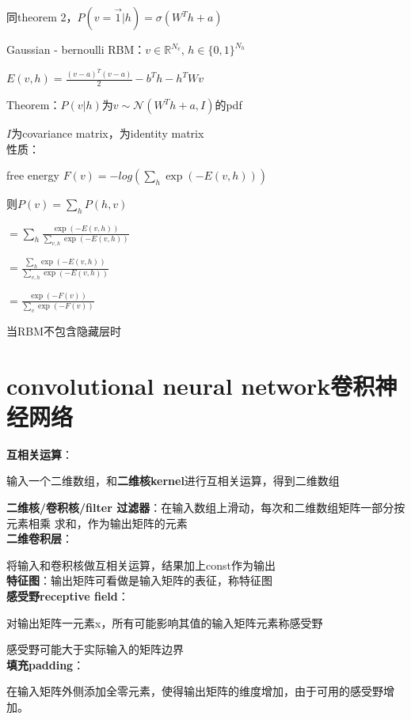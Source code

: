 \documentclass[UTF8]{ctexart}
\begin{document}
  \quad 同theorem 2，$P(v = \vec{1} | h) = \sigma(W^Th + a)$

  Gaussian - bernoulli RBM：$v \in \mathbb{R}^{N_v}$, $h \in \{0, 1\}^{N_h}$

  \quad $E(v, h) = \frac{(v - a)^T(v - a)}{2} - b^Th - h^TWv$

  \quad Theorem：$P(v | h)$为$v \sim \mathcal{N}(W^Th + a, I)$的pdf

  \quad \quad $I$为covariance matrix，为identity matrix\\
性质：

  free energy $F(v) = -log(\sum_h \exp(-E(v, h)))$

  \quad 则$P(v) = \sum_h P(h, v)$

  \quad \quad $ = \sum_h \frac{\exp(-E(v, h))}{\sum_{v, h} \exp(-E(v, h))}$

  \quad \quad $ = \frac{\sum_h\exp(-E(v, h))}{\sum_{v, h} \exp(-E(v, h))}$

  \quad \quad $ = \frac{\exp(-F(v))}{\sum_v \exp(-F(v))}$

  当RBM不包含隐藏层时



\section{convolutional neural network卷积神经网络}
\noindent \textbf{互相关运算}：

  输入一个二维数组，和\textbf{二维核kernel}进行互相关运算，得到二维数组

  \textbf{二维核/卷积核/filter 过滤器}：在输入数组上滑动，每次和二维数组矩阵一部分按元素相乘 求和，作为输出矩阵的元素\\
\textbf{二维卷积层}：

  将输入和卷积核做互相关运算，结果加上const作为输出\\
\textbf{特征图}：输出矩阵可看做是输入矩阵的表征，称特征图\\
\textbf{感受野receptive field}：
  
  对输出矩阵一元素x，所有可能影响其值的输入矩阵元素称感受野

  感受野可能大于实际输入的矩阵边界\\
\textbf{填充padding}：
  
  在输入矩阵外侧添加全零元素，使得输出矩阵的维度增加，由于可用的感受野增加。
\end{document}
